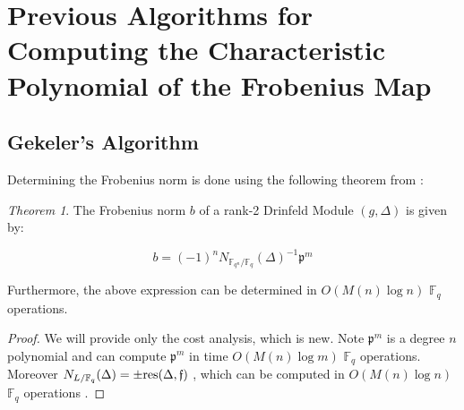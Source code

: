 \documentclass{jams-l}
\theoremstyle{remark}
\numberwithin{equation}{section}
\newtheorem{theorem}{Theorem}
\newcommand{\frakf}{\mathfrak{f}}
\begin{document}


\section{Previous Algorithms for Computing the Characteristic Polynomial of the Frobenius Map}

\subsection{Gekeler's Algorithm}

 Determining the Frobenius norm is done using the following theorem from \cite{frobdist}:

\begin{theorem}\label{frobnorm}
The Frobenius norm $b$ of a rank-2 Drinfeld Module $(g,\Delta)$ is given by:

\[b = (-1)^n N_{\mathbb{F}_{q^n}/\mathbb{F}_q}(\Delta)^{-1}\mathfrak{p}^m\]

Furthermore, the above expression can be determined in $O(M(n)\log n)$ $\mathbb{F}_q$ operations.

\end{theorem}

\begin{proof}
We will provide only the cost analysis, which is new. Note $\mathfrak{p}^m$  is a degree $n$ polynomial and can compute $\mathfrak{p}^m$ in time $O(M(n) \log m)$ $\mathbb{F}_q$ operations. Moreover $N_{L/\mathbb{F}_q}(\Delta) = \pm \textnormal{res}(\Delta,\frakf)$ \cite{Pohst:1989:AAN:76692}, which can be computed in $O(M(n)\log n)$ $\mathbb{F}_q$ operations \cite{Pohst:1989:AAN:76692}.
\end{proof}
\end{document}
